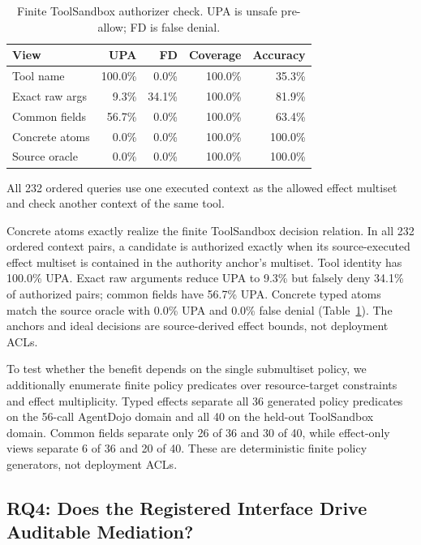 \documentclass[letterpaper,twocolumn,10pt]{article}
\theoremstyle{definition}
\begin{document}
\begin{table}[t]
\centering
\scriptsize
\setlength{\tabcolsep}{2.5pt}
\caption{Finite ToolSandbox authorizer check. UPA is unsafe pre-allow; FD is false denial.}
\label{tab:concrete-atom-authorizer}
\begin{tabular}{@{}lrrrr@{}}
\toprule
View & UPA & FD & Coverage & Accuracy \\
\midrule
Tool name & 100.0\% & 0.0\% & 100.0\% & 35.3\% \\
Exact raw args & 9.3\% & 34.1\% & 100.0\% & 81.9\% \\
Common fields & 56.7\% & 0.0\% & 100.0\% & 63.4\% \\
Concrete atoms & 0.0\% & 0.0\% & 100.0\% & 100.0\% \\
Source oracle & 0.0\% & 0.0\% & 100.0\% & 100.0\% \\
\bottomrule
\end{tabular}
\vspace{2pt}\parbox{0.98\linewidth}{\footnotesize All 232 ordered queries use one executed context as the allowed effect multiset and check another context of the same tool.}
\end{table}


Concrete atoms exactly realize the finite ToolSandbox decision relation.  In
all 232 ordered context pairs, a candidate is authorized exactly when its
source-executed effect multiset is contained in the authority anchor's
multiset.  Tool identity has 100.0\% UPA.  Exact raw arguments reduce UPA to
9.3\% but falsely deny 34.1\% of authorized pairs; common fields have 56.7\%
UPA.  Concrete typed atoms match the source oracle with 0.0\% UPA and 0.0\%
false denial (Table~\ref{tab:concrete-atom-authorizer}).  The anchors and ideal
decisions are source-derived effect bounds, not deployment ACLs.

To test whether the benefit depends on the single submultiset policy, we
additionally enumerate finite policy predicates over resource-target
constraints and effect multiplicity.  Typed effects separate all 36 generated
policy predicates on the 56-call AgentDojo domain and all 40 on the held-out
ToolSandbox domain.  Common fields separate only 26 of 36 and 30 of 40, while
effect-only views separate 6 of 36 and 20 of 40.  These are deterministic
finite policy generators, not deployment ACLs.

\subsection{RQ4: Does the Registered Interface Drive Auditable Mediation?}
\end{document}
